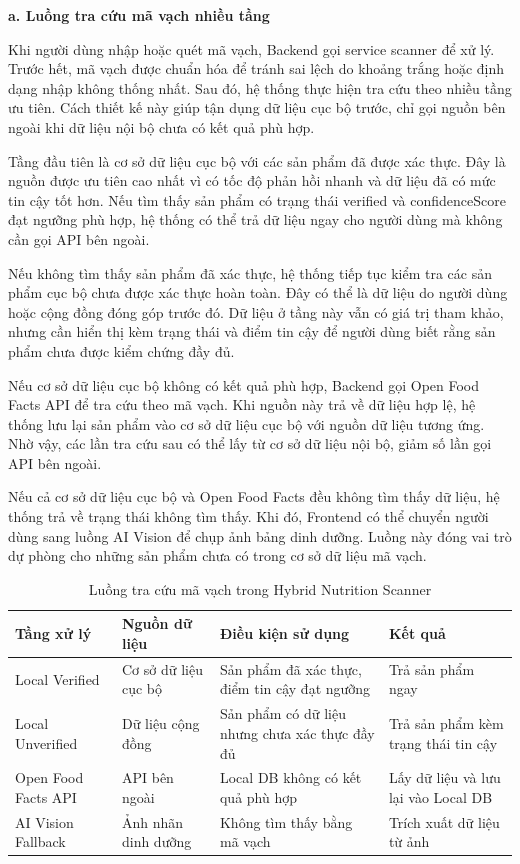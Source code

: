 \documentclass[12pt, a4paper]{report}
\begin{document}
\textbf{a. Luồng tra cứu mã vạch nhiều tầng}

Khi người dùng nhập hoặc quét mã vạch, Backend gọi service scanner để xử lý. Trước hết, mã vạch được chuẩn hóa để tránh sai lệch do khoảng trắng hoặc định dạng nhập không thống nhất. Sau đó, hệ thống thực hiện tra cứu theo nhiều tầng ưu tiên. Cách thiết kế này giúp tận dụng dữ liệu cục bộ trước, chỉ gọi nguồn bên ngoài khi dữ liệu nội bộ chưa có kết quả phù hợp.

Tầng đầu tiên là cơ sở dữ liệu cục bộ với các sản phẩm đã được xác thực. Đây là nguồn được ưu tiên cao nhất vì có tốc độ phản hồi nhanh và dữ liệu đã có mức tin cậy tốt hơn. Nếu tìm thấy sản phẩm có trạng thái verified và confidenceScore đạt ngưỡng phù hợp, hệ thống có thể trả dữ liệu ngay cho người dùng mà không cần gọi API bên ngoài.

Nếu không tìm thấy sản phẩm đã xác thực, hệ thống tiếp tục kiểm tra các sản phẩm cục bộ chưa được xác thực hoàn toàn. Đây có thể là dữ liệu do người dùng hoặc cộng đồng đóng góp trước đó. Dữ liệu ở tầng này vẫn có giá trị tham khảo, nhưng cần hiển thị kèm trạng thái và điểm tin cậy để người dùng biết rằng sản phẩm chưa được kiểm chứng đầy đủ.

Nếu cơ sở dữ liệu cục bộ không có kết quả phù hợp, Backend gọi Open Food Facts API để tra cứu theo mã vạch. Khi nguồn này trả về dữ liệu hợp lệ, hệ thống lưu lại sản phẩm vào cơ sở dữ liệu cục bộ với nguồn dữ liệu tương ứng. Nhờ vậy, các lần tra cứu sau có thể lấy từ cơ sở dữ liệu nội bộ, giảm số lần gọi API bên ngoài.

Nếu cả cơ sở dữ liệu cục bộ và Open Food Facts đều không tìm thấy dữ liệu, hệ thống trả về trạng thái không tìm thấy. Khi đó, Frontend có thể chuyển người dùng sang luồng AI Vision để chụp ảnh bảng dinh dưỡng. Luồng này đóng vai trò dự phòng cho những sản phẩm chưa có trong cơ sở dữ liệu mã vạch.

\begin{table}[htbp]
\centering
\caption{Luồng tra cứu mã vạch trong Hybrid Nutrition Scanner}
\begin{tabular}{|p{3cm}|p{3cm}|p{4cm}|p{5cm}|}
\hline
\textbf{Tầng xử lý} & \textbf{Nguồn dữ liệu} & \textbf{Điều kiện sử dụng} & \textbf{Kết quả} \\
\hline
Local Verified & Cơ sở dữ liệu cục bộ & Sản phẩm đã xác thực, điểm tin cậy đạt ngưỡng & Trả sản phẩm ngay \\
\hline
Local Unverified & Dữ liệu cộng đồng & Sản phẩm có dữ liệu nhưng chưa xác thực đầy đủ & Trả sản phẩm kèm trạng thái tin cậy \\
\hline
Open Food Facts API & API bên ngoài & Local DB không có kết quả phù hợp & Lấy dữ liệu và lưu lại vào Local DB \\
\hline
AI Vision Fallback & Ảnh nhãn dinh dưỡng & Không tìm thấy bằng mã vạch & Trích xuất dữ liệu từ ảnh \\
\hline
\hline
\hline
\hline
\hline
\hline
\end{tabular}
\end{table}
\end{document}
